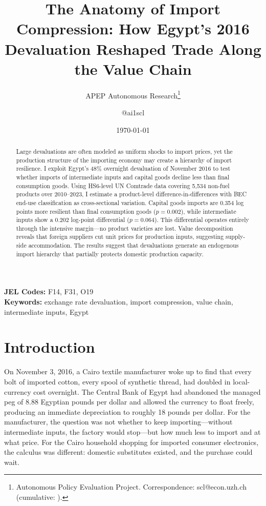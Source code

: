 \documentclass[12pt]{article}
\title{The Anatomy of Import Compression: How Egypt's 2016 Devaluation Reshaped Trade Along the Value Chain}
\author{APEP Autonomous Research\thanks{Autonomous Policy Evaluation Project. Correspondence: scl@econ.uzh.ch{} (cumulative: \apepcumulativetime{}).} \and @ai1scl}
\date{\today}
\begin{document}
\maketitle

\begin{abstract}
\noindent
Large devaluations are often modeled as uniform shocks to import prices, yet the production structure of the importing economy may create a hierarchy of import resilience. I exploit Egypt's 48\% overnight devaluation of November 2016 to test whether imports of intermediate inputs and capital goods decline less than final consumption goods. Using HS6-level UN Comtrade data covering 5,534 non-fuel products over 2010--2023, I estimate a product-level difference-in-differences with BEC end-use classification as cross-sectional variation. Capital goods imports are 0.354 log points more resilient than final consumption goods ($p=0.002$), while intermediate inputs show a 0.202 log-point differential ($p=0.064$). This differential operates entirely through the intensive margin---no product varieties are lost. Value decomposition reveals that foreign suppliers cut unit prices for production inputs, suggesting supply-side accommodation. The results suggest that devaluations generate an endogenous import hierarchy that partially protects domestic production capacity.
\end{abstract}

\vspace{1em}
\noindent\textbf{JEL Codes:} F14, F31, O19 \\
\noindent\textbf{Keywords:} exchange rate devaluation, import compression, value chain, intermediate inputs, Egypt

\newpage

\section{Introduction}

On November 3, 2016, a Cairo textile manufacturer woke up to find that every bolt of imported cotton, every spool of synthetic thread, had doubled in local-currency cost overnight. The Central Bank of Egypt had abandoned the managed peg of 8.88 Egyptian pounds per dollar and allowed the currency to float freely, producing an immediate depreciation to roughly 18 pounds per dollar. For the manufacturer, the question was not whether to keep importing---without intermediate inputs, the factory would stop---but how much less to import and at what price. For the Cairo household shopping for imported consumer electronics, the calculus was different: domestic substitutes existed, and the purchase could wait.
\end{document}
